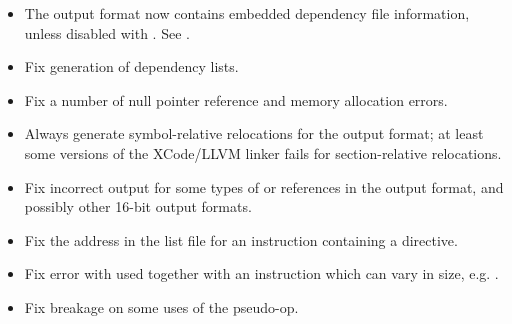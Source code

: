 \begin{itemize}
    \item{The  output format now contains embedded dependency file
        information, unless disabled with . See
        .}

    \item{Fix generation of dependency lists.}

    \item{Fix a number of null pointer reference and memory allocation errors.}

    \item{Always generate symbol-relative relocations for the 
        output format; at least some versions of the XCode/LLVM linker fails
        for section-relative relocations.}
\end{itemize}


\begin{itemize}
    \item{Fix incorrect output for some types of  or 
        references in the  output format, and possibly other 16-bit
        output formats.}

    \item{Fix the address in the list file for an instruction containing a
         directive.}

    \item{Fix error with  used together with an instruction which
        can vary in size, e.g. .}

    \item{Fix breakage on some uses of the  pseudo-op.}
\end{itemize}


